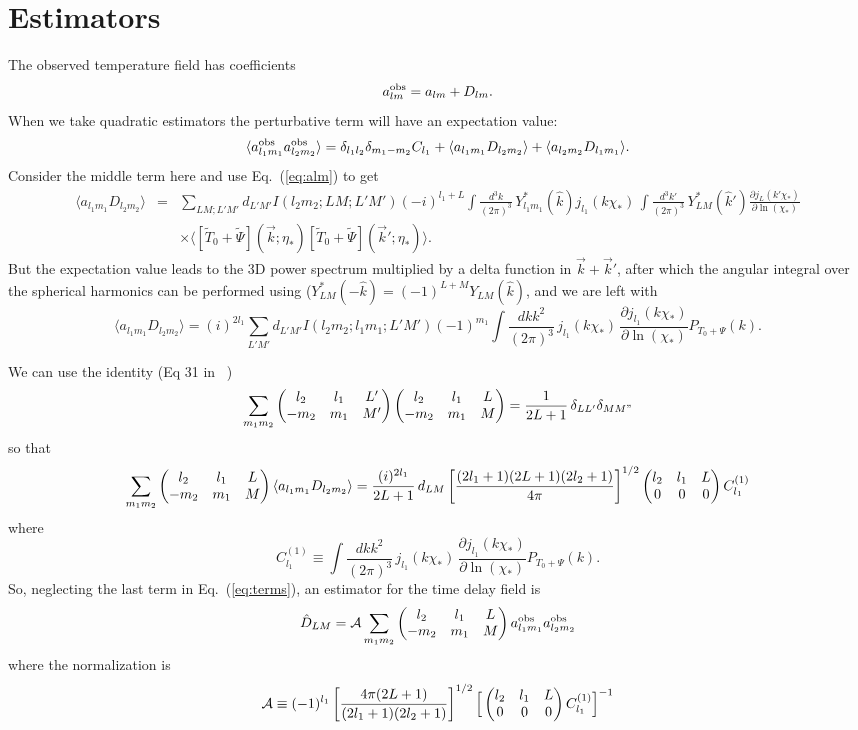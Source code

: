\documentclass[prd,amsmath,amssymb,floatfix,superscriptaddress,nofootinbib,preprintnumbers]{revtex4-1}
\def\be{\begin{equation}}
\def\ee{\end{equation}}
\def\bea{\begin{eqnarray}}
\def\eea{\end{eqnarray}}
\newcommand{\vs}{\nonumber\\}
\newcommand{\ec}[1]{Eq.~(\ref{eq:#1})}
\newcommand{\eql}[1]{\label{eq:#1}}
\begin{document}
\section{Estimators}

The observed temperature field has coefficients
\be
a^{\rm obs}_{lm} = a_{lm} + D_{lm}
.\ee
When we take quadratic estimators the perturbative term will have an expectation value:
\be
\langle a^{\rm obs}_{l_1m_1} a^{\rm obs}_{l_2m_2} \rangle= \delta_{l_1l_2}\delta_{m_1-m_2}C_{l_1} + \langle a_{l_1m_1}D_{l_2m_2}\rangle+ \langle a_{l_2m_2}D_{l_1m_1}\rangle
.\eql{terms}
\ee
Consider the middle term here and use \ec{alm} to get
\bea
\langle a_{l_1m_1}D_{l_2m_2}\rangle&=&\sum_{LM;L'M'}d_{L'M'}  I(l_2m_2;LM;L'M')
 (-i)^{l_1+L} \int \frac{d^3k}{(2\pi)^3}\, Y_{l_1m_1}^*(\hat k) j_{l_1}(k\chi_*)\,
 \int \frac{d^3k'}{(2\pi)^3}\, Y_{LM}^*(\hat k') \frac{\partial j_L(k'\chi_*)}{\partial\ln(\chi_*)}
\vs
&&\times\langle  [\tilde T_0+\tilde\Psi](\vec k;\eta_*)  [\tilde T_0+\tilde\Psi](\vec k';\eta_*) \rangle.
\eea
But the expectation value leads to the 3D power spectrum multiplied by a delta function in $\vec k+\vec k'$, after which the angular integral over the spherical harmonics can be performed using ($Y_{LM}^*(-\hat k)=(-1)^{L+M}Y_{LM}(\hat k)$, and we are left with
\be
\langle a_{l_1m_1}D_{l_2m_2}\rangle=(i)^{2l_1}\sum_{L'M'}d_{L'M'}  I(l_2m_2;l_1m_1;L'M')
 (-1)^{m_1} \int \frac{dk k^2}{(2\pi)^3}\, j_{l_1}(k\chi_*)\,\frac{\partial j_{l_1}(k\chi_*)}{\partial\ln(\chi_*)}P_{T_0+\Psi}(k).
\ee

We can use the identity (Eq 31 in ~\cite{Okamoto:2003zw})
\be
\sum_{m_1m_2} 
 \left(\begin{matrix} l_2 & l_1 &L'\cr -m_2&m_1&M'\end{matrix}\right)
 \left(\begin{matrix} l_2 & l_1 &L\cr -m_2&m_1&M\end{matrix}\right)
=\frac{1}{2L+1}\,\delta_{LL'}\delta_{MM"}
\ee
so that
\be
\sum_{m_1m_2}  \left(\begin{matrix} l_2 & l_1 &L\cr -m_2&m_1&M\end{matrix}\right) \langle a_{l_1m_1}D_{l_2m_2}\rangle
= \frac{(i)^{2l_1}}{2L+1}\,d_{LM} 
 \left[ \frac{(2l_1+1)(2L+1)(2l_2+1)}{4\pi}\right]^{1/2}\left(\begin{matrix} l_2& l_1 &L\cr 0&0&0\end{matrix}\right)
 C^{(1)}_{l_1}
\ee
where
\be
C^{(1)}_{l_1}\equiv \int \frac{dk k^2}{(2\pi)^3}\, j_{l_1}(k\chi_*)\,\frac{\partial j_{l_1}(k\chi_*)}{\partial\ln(\chi_*)}P_{T_0+\Psi}(k).
\ee
So, neglecting the last term in \ec{terms}, an estimator for the time delay field is
\be
\hat D_{LM} = \mathcal{A} \sum_{m_1m_2}  \left(\begin{matrix} l_2 & l_1 &L\cr -m_2&m_1&M\end{matrix}\right)
 a^{\rm obs}_{l_1m_1} a^{\rm obs}_{l_2m_2} \ee
 where the normalization is
 \be
 \mathcal{A} \equiv (-1)^{l_1}
 \left[ \frac{4\pi (2L+1)}{(2l_1+1)(2l_2+1)}\right]^{1/2}
 \Big[
 \left(\begin{matrix} l_2& l_1 &L\cr 0&0&0\end{matrix}\right)
 C^{(1)}_{l_1}
 \Big]^{-1}
 \ee
 

\end{document}
